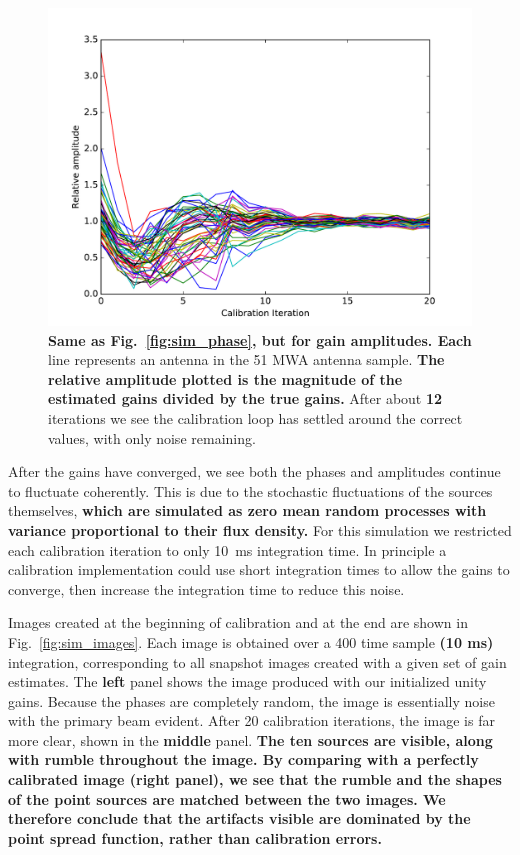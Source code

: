 \documentclass[a4paper,fleqn,usenatbib]{../mnras}
\begin{document}
\begin{figure}
\begin{center}
\includegraphics[width=\columnwidth]{fig4.pdf}
\caption{\textbf{Same as Fig.~\ref{fig:sim_phase}, but for gain amplitudes.
Each} line represents an antenna in the 51 MWA antenna sample. 
\textbf{The relative amplitude plotted is the magnitude of the estimated gains divided by the true gains.}
After about \textbf{12} iterations we see the 
calibration loop has settled around the correct values, with only noise remaining.}
\label{fig:sim_amp}
\end{center}
\end{figure}

After the gains have converged, we see both the phases and amplitudes continue to 
fluctuate coherently. This is due to the stochastic fluctuations of the sources 
themselves, \textbf{which are simulated as zero mean random processes with variance proportional
to their flux density.}
For this simulation we restricted each calibration 
iteration to only 10~ms integration time. In principle a calibration implementation could use 
short integration times to allow the gains to converge, then increase the integration time to 
reduce this noise.

Images created at the beginning of calibration and at the end are shown in 
Fig.~\ref{fig:sim_images}. Each image is obtained over a 400 time sample \textbf{(10 ms)} integration, corresponding to 
all snapshot images created with a given set of gain estimates. The \textbf{left} panel shows the image 
produced with our initialized unity gains. Because the phases are completely random, the 
image is essentially noise with the primary beam evident. After 20 calibration iterations, the image is far 
more clear, shown in the \textbf{middle} panel. 
\textbf{The ten sources are visible, along with rumble throughout the image. By comparing with
a perfectly calibrated image (right panel), we see that the rumble and the shapes of the
point sources are matched between the two images. We therefore conclude that the 
artifacts visible are dominated by the point spread function, rather than calibration errors.}
\end{document}
